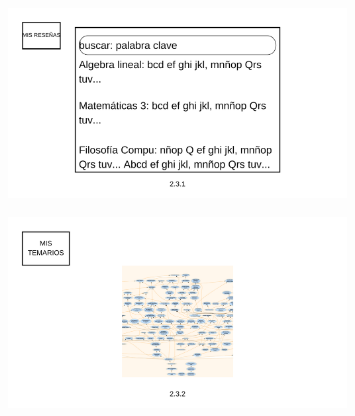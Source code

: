 \documentclass{report}
\begin{document}
\begin{figure}[H]
    \centering
    \includegraphics[width=0.8\textwidth]{./Diagramas/22.png}
\end{figure}

\begin{figure}[H]
    \centering
    \includegraphics[width=0.8\textwidth]{./Diagramas/23.png}
\end{figure}
\end{document}
